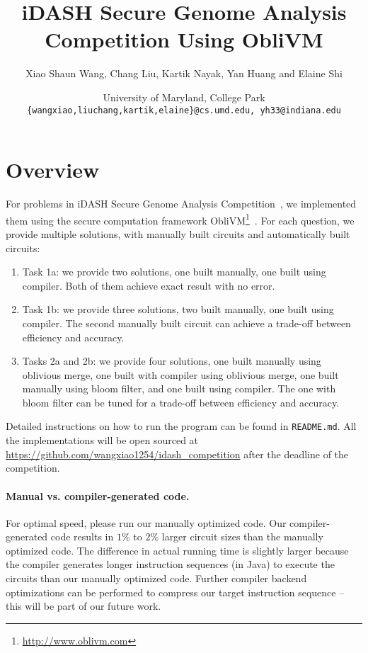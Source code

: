 \documentclass[11pt]{article}
\title{iDASH Secure Genome Analysis Competition Using {\sf ObliVM}}
\author{Xiao Shaun Wang, Chang Liu, Kartik Nayak, Yan Huang and Elaine Shi}
\date{University of Maryland, College Park\\
{\tt \{wangxiao,liuchang,kartik,elaine\}@cs.umd.edu, yh33@indiana.edu}}
\begin{document}
\maketitle
\section{Overview}
For problems in iDASH Secure Genome Analysis Competition~\cite{idash}, we implemented them using the secure computation framework {\sf ObliVM}\footnote{\url{http://www.oblivm.com}}~\cite{oblivm}.
For each question, we provide multiple solutions, with manually built circuits and automatically built circuits:
\begin{enumerate}
\item Task 1a: we provide two solutions, one built manually, one built using compiler. Both of them achieve exact result with no error.
\item Task 1b: we provide three solutions, two built manually, one built using compiler. The second manually built circuit can achieve a trade-off between efficiency and accuracy.
\item Tasks 2a and 2b: we provide four solutions, one built manually using oblivious merge, one built with compiler using oblivious merge, one built manually using bloom filter, and one built using compiler. The one with bloom filter can be tuned for a trade-off between efficiency and accuracy.
\end{enumerate}

Detailed instructions on how to run the program can be found in {\tt README.md}.
All the implementations will be open sourced at \url{https://github.com/wangxiao1254/idash_competition} after the deadline of the competition.



\paragraph{Manual vs. compiler-generated code.}
For optimal speed, please run our manually optimized code. 
Our compiler-generated code  
results in $1\%$ to $2\%$ 
larger circuit sizes than the manually optimized code.
The difference in actual running time is slightly larger
because the compiler generates longer 
instruction sequences (in Java)
to execute the circuits
than our manually optimized code. 
Further compiler backend optimizations can be performed 
to compress our target instruction sequence -- this will 
be part of our future work.
\end{document}
